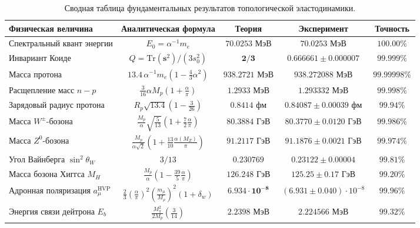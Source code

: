 \documentclass[11pt,a4paper,oneside]{article}
\theoremstyle{plain}
\theoremstyle{definition}
\theoremstyle{remark}
\numberwithin{equation}{section}
\begin{document}
\begin{table}[h!]
\centering
\small
\caption{Сводная таблица фундаментальных результатов топологической эластодинамики.}
\label{tab:grand_summary}
\begin{tabularx}{\textwidth}{lcccc}
	\toprule
	\textbf{Физическая величина} & \textbf{Аналитическая формула} & \textbf{Теория} & \textbf{Эксперимент} & \textbf{Точность} \\
	\midrule
	Спектральный квант энергии & $E_0 = \alpha^{-1} m_e$ & $\mathbf{70.0253 \text{ МэВ}}$ & $70.0253 \text{ МэВ}$ & $\mathbf{100.00\%}$ \\
	Инвариант Коиде & $Q = \mathrm{Tr}(\mathbf{s}^2)/(3s_0^2)$ & $\mathbf{2/3}$ & $0.666661 \pm 0.000007$ & $\mathbf{99.999\%}$ \\
	Масса протона & $13.4 \, \alpha^{-1} m_e (1 - \frac{4}{3}\alpha^2)$ & $\mathbf{938.2721 \text{ МэВ}}$ & $938.272088 \text{ МэВ}$ & $\mathbf{99.99998\%}$ \\
	Расщепление масс $n-p$ & $\frac{3}{16}\alpha M_p (1 + \frac{\alpha}{\pi})$ & $\mathbf{1.2933 \text{ МэВ}}$ & $1.293332 \text{ МэВ}$ & $\mathbf{99.998\%}$ \\
	Зарядовый радиус протона & $R_p \sqrt{13.4}(1 - \frac{3}{26})$ & $\mathbf{0.8414 \text{ фм}}$ & $0.84087 \pm 0.00039 \text{ фм}$ & $\mathbf{99.94\%}$ \\
	Масса $W^\pm$-бозона & $\frac{M_p}{\alpha}\sqrt{\frac{5}{13}}(1 + \frac{7}{2}\frac{\alpha}{\pi})$ & $\mathbf{80.3884 \text{ ГэВ}}$ & $80.3770 \pm 0.0120 \text{ ГэВ}$ & $\mathbf{99.986\%}$ \\
	Масса $Z^0$-бозона & $\frac{M_p}{\alpha\sqrt{2}}(1 + \frac{13}{10}\frac{\alpha(M_Z)}{\pi})$ & $\mathbf{91.2117 \text{ ГэВ}}$ & $91.1876 \pm 0.0021 \text{ ГэВ}$ & $\mathbf{99.974\%}$ \\
	Угол Вайнберга $\sin^2\theta_W$ & $3/13$ & $\mathbf{0.230769}$ & $0.23122 \pm 0.00004$ & $\mathbf{99.81\%}$ \\
	Масса бозона Хиггса $M_H$ & $\frac{M_p}{\alpha}(1 - \frac{39}{5}\frac{\alpha}{\pi})$ & $\mathbf{126.248 \text{ ГэВ}}$ & $125.25 \pm 0.17 \text{ ГэВ}$ & $\mathbf{99.20\%}$ \\
	Адронная поляризация $a_\mu^{\text{HVP}}$ & $\frac{2}{3}(\frac{\alpha}{\pi})^2 (\frac{m_\mu}{M_\rho})^2 (1 + \delta_w)$ & $\mathbf{6.934 \cdot 10^{-8}}$ & $(6.931 \pm 0.040) \cdot 10^{-8}$ & $\mathbf{99.96\%}$ \\
	Энергия связи дейтрона $E_b$ & $\frac{M_\pi^2}{2M_p} (\frac{3}{14})$ & $\mathbf{2.2398 \text{ МэВ}}$ & $2.224566 \text{ МэВ}$ & $\mathbf{99.32\%}$ \\

\end{tabularx}
\end{table}
\end{document}
